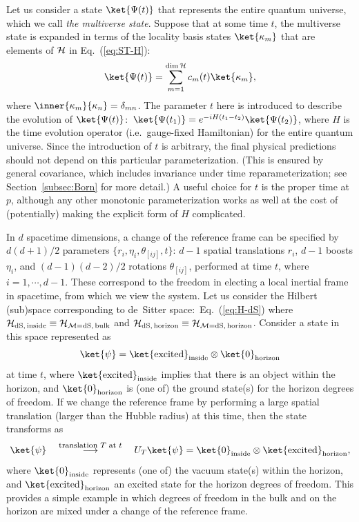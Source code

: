 \documentclass[12pt]{article}
\begin{document}
Let us consider a state $\ket{\Psi(t)}$ that represents the entire quantum 
universe, which we call {\it the multiverse state}.  Suppose that at 
some time $t$, the multiverse state is expanded in terms of the locality 
basis states $\ket{\kappa_m}$ that are elements of ${\cal H}$ in 
Eq.~(\ref{eq:ST-H}):
%
\begin{equation}
  \ket{\Psi(t)} = \sum_{m=1}^{{\rm dim}\,{\cal H}} c_m(t) \ket{\kappa_m},
\label{eq:Psi-multiverse}
\end{equation}
%
where $\inner{\kappa_m}{\kappa_n} = \delta_{mn}$.  The parameter $t$ 
here is introduced to describe the evolution of $\ket{\Psi(t)}$:\ 
$\ket{\Psi(t_1)} = e^{-iH(t_1-t_2)} \ket{\Psi(t_2)}$, where $H$ is the 
time evolution operator (i.e.\ gauge-fixed Hamiltonian) for the entire 
quantum universe.  Since the introduction of $t$ is arbitrary, the final 
physical predictions should not depend on this particular parameterization. 
(This is ensured by general covariance, which includes invariance under 
time reparameterization; see Section~\ref{subsec:Born} for more detail.) 
A useful choice for $t$ is the proper time at $p$, although any other 
monotonic parameterization works as well at the cost of (potentially) 
making the explicit form of $H$ complicated.

In $d$ spacetime dimensions, a change of the reference frame can be specified 
by $d(d+1)/2$ parameters $\{ r_i, \eta_i, \theta_{[ij]}, t\}$: $d-1$ 
spatial translations $r_i$, $d-1$ boosts $\eta_i$, and $(d-1)(d-2)/2$ 
rotations $\theta_{[ij]}$, performed at time $t$, where $i = 1,\cdots,d-1$. 
These correspond to the freedom in electing a local inertial frame in 
spacetime, from which we view the system.  Let us consider the Hilbert 
(sub)space corresponding to de~Sitter space:\ Eq.~(\ref{eq:H-dS}) where 
${\cal H}_{\rm dS,\, inside} \equiv {\cal H}_{{\cal M}={\rm dS,\, bulk}}$ 
and ${\cal H}_{\rm dS,\, horizon} \equiv {\cal H}_{{\cal M}={\rm dS,\, 
horizon}}$.  Consider a state in this space represented as
%
\begin{equation}
  \ket{\psi} = \ket{{\rm excited}}_{\rm inside} \otimes \ket{0}_{\rm horizon}
\label{eq:dS-before}
\end{equation}
%
at time $t$, where $\ket{{\rm excited}}_{\rm inside}$ implies that there 
is an object within the horizon, and $\ket{0}_{\rm horizon}$ is (one of) 
the ground state(s) for the horizon degrees of freedom.  If we change 
the reference frame by performing a large spatial translation (larger 
than the Hubble radius) at this time, then the state transforms as
%
\begin{equation}
  \ket{\psi} \quad
  \stackrel{\mbox{\footnotesize translation $T$ at $t$}}{\longrightarrow}
  \quad U_T \ket{\psi}
  = \ket{0}_{\rm inside} \otimes \ket{{\rm excited}}_{\rm horizon},
\label{eq:dS-after}
\end{equation}
%
where $\ket{0}_{\rm inside}$ represents (one of) the vacuum state(s) within 
the horizon, and $\ket{{\rm excited}}_{\rm horizon}$ an excited state 
for the horizon degrees of freedom.  This provides a simple example in 
which degrees of freedom in the bulk and on the horizon are mixed under 
a change of the reference frame.
\end{document}

